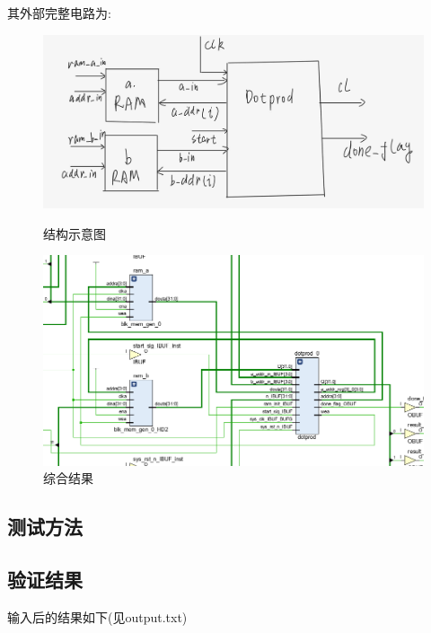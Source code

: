 \documentclass[12pt,hyperref,a4paper,UTF8]{ctexart}
\begin{document}
其外部完整电路为:


\begin{figure}[htbp]
    \centering
    \begin{minipage}{0.45\textwidth}
        \includegraphics[width=\linewidth]{./figures/结构示意图.png}
        \caption{结构示意图}
        \label{fig:sub1}
    \end{minipage}
    \hfill %
    \begin{minipage}{0.45\textwidth}
        \includegraphics[width=\linewidth]{./figures/综合结果.png}
        \caption{综合结果}
        \label{fig:sub2}
    \end{minipage}
\end{figure}

\subsection{测试方法}



\subsection{验证结果}

输入后的结果如下(见output.txt)
\end{document}
